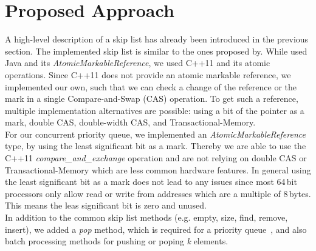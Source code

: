 \section{Proposed Approach}\label{sec:approach}
A high-level description of a skip list has already been introduced in the previous section. The implemented skip list is similar to the ones proposed by\cite{Herlihy:2008:AMP:1734069, Sundell:2005:FLC:1073765.1073770}. While \cite{Herlihy:2008:AMP:1734069} used Java and its \textit{AtomicMarkableReference}, we used C++11 and its atomic operations. Since C++11 does not provide an atomic markable reference, we implemented our own, such that we can check a change of the reference or the mark in a single Compare-and-Swap (CAS) operation. To get such a reference, multiple implementation alternatives are possible: using a bit of the pointer as a mark, double CAS, double-width CAS, and Transactional-Memory.\\
For our concurrent priority queue, we implemented an \textit{AtomicMarkableReference} type, by using the least significant bit as a mark. Thereby we are able to use the C++11 {\em compare\_and\_exchange} operation and are not relying on double CAS or Transactional-Memory which are less common hardware features. In general using the least significant bit as a mark does not lead to any issues since most 64\,bit processors only allow read or write from addresses which are a multiple of 8\,bytes. This means the leas significant bit is zero and unused.\\
In addition to the common skip list methods (e.g. empty, size, find, remove, insert), we added a \textit{pop} method, which is required for a priority queue~\cite{Herlihy:2008:AMP:1734069}, and also batch processing methods for pushing or poping \textit{k} elements.



